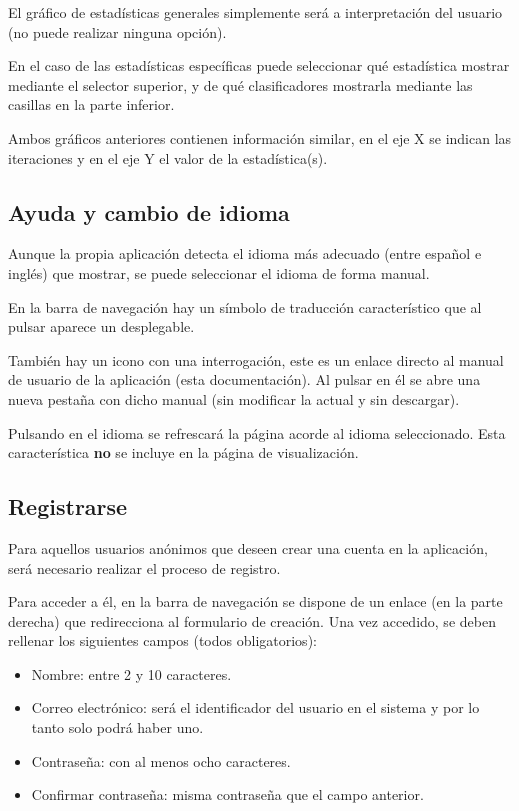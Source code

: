 El gráfico de estadísticas generales simplemente será a interpretación del
usuario (no puede realizar ninguna opción). 

En el caso de las estadísticas específicas puede seleccionar qué estadística
mostrar mediante el selector superior, y de qué clasificadores mostrarla
mediante las casillas en la parte inferior.

Ambos gráficos anteriores contienen información similar, en el eje X se indican
las iteraciones y en el eje Y el valor de la estadística(s).

\subsection{Ayuda y cambio de idioma}



Aunque la propia aplicación detecta el idioma más adecuado (entre español e
inglés) que mostrar, se puede seleccionar el idioma de forma manual.

En la barra de navegación hay un símbolo de traducción característico que al
pulsar aparece un desplegable.

También hay un icono con una interrogación, este es un enlace directo al manual
de usuario de la aplicación (esta documentación). Al pulsar en él se abre una
nueva pestaña con dicho manual (sin modificar la actual y sin descargar).


Pulsando en el idioma se refrescará la página acorde al idioma seleccionado.
Esta característica \textbf{no} se incluye en la página de visualización.

\subsection{Registrarse}

Para aquellos usuarios anónimos que deseen crear una cuenta en la aplicación,
será necesario realizar el proceso de registro.

Para acceder a él, en la barra de navegación se dispone de un enlace (en la
parte derecha) que redirecciona al formulario de creación. Una vez accedido, se
deben rellenar los siguientes campos (todos obligatorios):
\begin{itemize}
    \item Nombre: entre 2 y 10 caracteres.
    \item Correo electrónico: será el identificador del usuario en el sistema y
    por lo tanto solo podrá haber uno.
    \item Contraseña: con al menos ocho caracteres.
    \item Confirmar contraseña: misma contraseña que el campo anterior.
\end{itemize}

